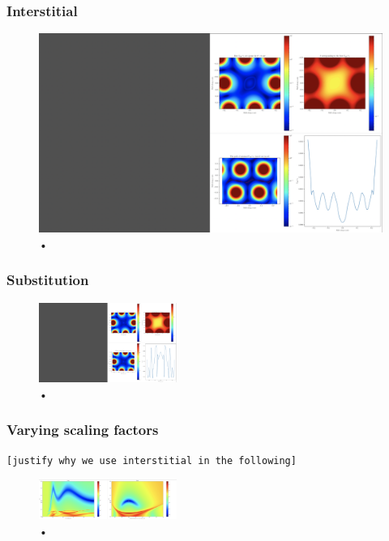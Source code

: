 \documentclass[aps,pra,superscriptaddress,twocolumn]{revtex4-1}
\newcommand{\commentSO}[1]{\texttt{\color{orange}[#1]}}
\begin{document}
\subsubsection{Interstitial}

\begin{figure}
    \centering
    \includegraphics[width=1.0\textwidth]{figures/mono_rect_plaquettes_interstitial.png} 
    \caption{•}
    \label{fig:mono_rect_plaquette_interstitial}
\end{figure}


\subsubsection{Substitution}

\begin{figure}
    \centering
    \includegraphics[width=0.4\textwidth]{figures/mono_rect_plaquettes_substitution.png} 
    \caption{•}
    \label{fig:mono_rect_plaquette_substitution}
\end{figure}

\subsubsection{Varying scaling factors}
\commentSO{justify why we use interstitial in the following}

\begin{figure}
    \centering
    \includegraphics[width=0.4\textwidth]{figures/mono_rect_thetadelta.png} 
    \caption{•}
    \label{fig:mono_rect_thetadelta}
\end{figure}
\end{document}
